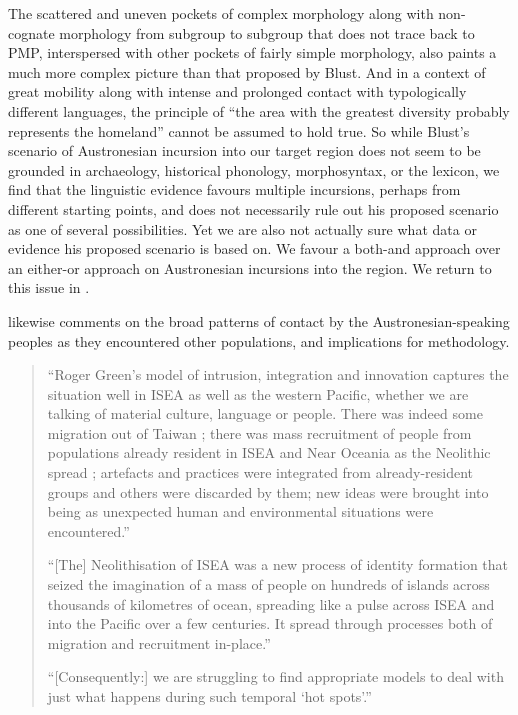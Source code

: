The scattered and uneven pockets of complex morphology along with non-cognate morphology from subgroup
to subgroup that does not trace back to PMP,
interspersed with other pockets of fairly simple morphology,
also paints a much more complex picture than that proposed by Blust.
And in a context of great mobility along with intense
and prolonged contact with typologically different languages,
the principle of “the area with the greatest diversity probably represents the homeland” cannot be assumed to hold true.
So while Blust’s scenario of Austronesian incursion into our target region does not seem to be grounded
in archaeology, historical phonology, morphosyntax, or the lexicon, we find that the linguistic evidence favours multiple
incursions, perhaps from different starting points,
and does not necessarily rule out his proposed scenario as one of several possibilities.
Yet we are also not actually sure what data or evidence his proposed scenario is based on.
We favour a both-and approach over an either-or approach on Austronesian incursions into the region.
We return to this issue in .

\citet{Spriggs2011} likewise comments on the broad patterns of contact by the Austronesian-speaking peoples
as they encountered other populations,
and implications for methodology.

\begin{quote}
	``Roger Green’s \citeyear{Green1991,Green2000} model of intrusion,
	integration and innovation captures the situation well in ISEA as well as the western Pacific,
	whether we are talking of material culture, language or people.
	There was indeed some migration out of Taiwan \citep{Kayser2008};
	there was mass recruitment of people from populations already resident in ISEA
	and Near Oceania as the Neolithic spread \citep{Soares2011};
	artefacts and practices were integrated from already-resident groups
	and others were discarded by them; new ideas were brought into being as unexpected human
	and environmental situations were encountered.'' \citep[523]{Spriggs2011}

	``[The] Neolithisation of ISEA was a new process of identity formation that seized the imagination of a
	mass of people on hundreds of islands across thousands of kilometres of ocean,
	spreading like a pulse across ISEA
	and into the Pacific over a few centuries.
	It spread through processes both of migration and recruitment in-place.''
	 \citep[524]{Spriggs2011}

	``[Consequently:] we are struggling to find appropriate models to deal with just what happens during such
	temporal ‘hot spots’.'' \citep[523]{Spriggs2011}									
\end{quote}

